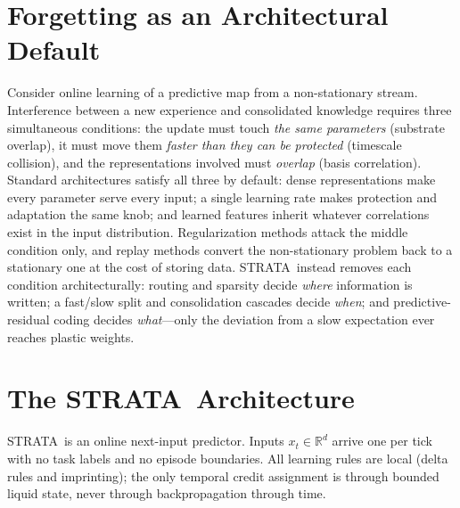 \documentclass[11pt]{article}
\newcommand{\strata}{STRATA}
\begin{document}
\section{Forgetting as an Architectural Default}
\label{sec:principles}

Consider online learning of a predictive map from a non-stationary stream.
Interference between a new experience and consolidated knowledge requires
three simultaneous conditions: the update must touch \emph{the same
parameters} (substrate overlap), it must move them \emph{faster than they
can be protected} (timescale collision), and the representations involved
must \emph{overlap} (basis correlation). Standard architectures satisfy all
three by default: dense representations make every parameter serve every
input; a single learning rate makes protection and adaptation the same
knob; and learned features inherit whatever correlations exist in the
input distribution. Regularization methods attack the middle condition
only, and replay methods convert the non-stationary problem back to a
stationary one at the cost of storing data. \strata\ instead removes each
condition architecturally: routing and sparsity decide \emph{where}
information is written; a fast/slow split and consolidation cascades decide
\emph{when}; and predictive-residual coding decides \emph{what}---only the
deviation from a slow expectation ever reaches plastic weights.

\section{The \strata\ Architecture}
\label{sec:architecture}

\strata\ is an online next-input predictor. Inputs $x_t \in \mathbb{R}^d$
arrive one per tick with no task labels and no episode boundaries. All
learning rules are local (delta rules and imprinting); the only
temporal credit assignment is through bounded liquid state, never through
backpropagation through time.
\end{document}
